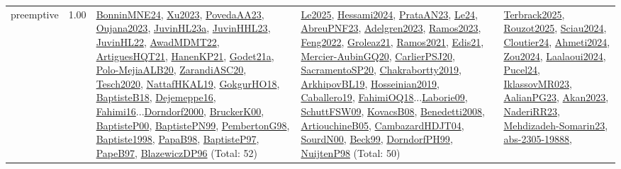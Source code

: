 {\begin{longtable}{p{3cm}r>{\raggedright\arraybackslash}p{6cm}>{\raggedright\arraybackslash}p{6cm}>{\raggedright\arraybackslash}p{8cm}}
\index{preemptive}\index{Concepts!preemptive}preemptive &  1.00 & \hyperref[detail:BonninMNE24]{BonninMNE24}, \hyperref[detail:Xu2023]{Xu2023}, \hyperref[detail:PovedaAA23]{PovedaAA23}, \hyperref[detail:Oujana2023]{Oujana2023}, \hyperref[detail:JuvinHL23a]{JuvinHL23a}, \hyperref[detail:JuvinHHL23]{JuvinHHL23}, \hyperref[detail:JuvinHL22]{JuvinHL22}, \hyperref[detail:AwadMDMT22]{AwadMDMT22}, \hyperref[detail:ArtiguesHQT21]{ArtiguesHQT21}, \hyperref[detail:HanenKP21]{HanenKP21}, \hyperref[detail:Godet21a]{Godet21a}, \hyperref[detail:Polo-MejiaALB20]{Polo-MejiaALB20}, \hyperref[detail:ZarandiASC20]{ZarandiASC20}, \hyperref[detail:Tesch2020]{Tesch2020}, \hyperref[detail:NattafHKAL19]{NattafHKAL19}, \hyperref[detail:GokgurHO18]{GokgurHO18}, \hyperref[detail:BaptisteB18]{BaptisteB18}, \hyperref[detail:Dejemeppe16]{Dejemeppe16}, \hyperref[detail:Fahimi16]{Fahimi16}...\hyperref[detail:Dorndorf2000]{Dorndorf2000}, \hyperref[detail:BruckerK00]{BruckerK00}, \hyperref[detail:BaptisteP00]{BaptisteP00}, \hyperref[detail:BaptistePN99]{BaptistePN99}, \hyperref[detail:PembertonG98]{PembertonG98}, \hyperref[detail:Baptiste1998]{Baptiste1998}, \hyperref[detail:PapaB98]{PapaB98}, \hyperref[detail:BaptisteP97]{BaptisteP97}, \hyperref[detail:PapeB97]{PapeB97}, \hyperref[detail:BlazewiczDP96]{BlazewiczDP96} (Total: 52) & \hyperref[detail:Le2025]{Le2025}, \hyperref[detail:Hessami2024]{Hessami2024}, \hyperref[detail:PrataAN23]{PrataAN23}, \hyperref[detail:Le24]{Le24}, \hyperref[detail:AbreuPNF23]{AbreuPNF23}, \hyperref[detail:Adelgren2023]{Adelgren2023}, \hyperref[detail:Ramos2023]{Ramos2023}, \hyperref[detail:Feng2022]{Feng2022}, \hyperref[detail:Groleaz21]{Groleaz21}, \hyperref[detail:Ramos2021]{Ramos2021}, \hyperref[detail:Edis21]{Edis21}, \hyperref[detail:Mercier-AubinGQ20]{Mercier-AubinGQ20}, \hyperref[detail:CarlierPSJ20]{CarlierPSJ20}, \hyperref[detail:SacramentoSP20]{SacramentoSP20}, \hyperref[detail:Chakrabortty2019]{Chakrabortty2019}, \hyperref[detail:ArkhipovBL19]{ArkhipovBL19}, \hyperref[detail:Hosseinian2019]{Hosseinian2019}, \hyperref[detail:Caballero19]{Caballero19}, \hyperref[detail:FahimiOQ18]{FahimiOQ18}...\hyperref[detail:Laborie09]{Laborie09}, \hyperref[detail:SchuttFSW09]{SchuttFSW09}, \hyperref[detail:KovacsB08]{KovacsB08}, \hyperref[detail:Benedetti2008]{Benedetti2008}, \hyperref[detail:ArtiouchineB05]{ArtiouchineB05}, \hyperref[detail:CambazardHDJT04]{CambazardHDJT04}, \hyperref[detail:SourdN00]{SourdN00}, \hyperref[detail:Beck99]{Beck99}, \hyperref[detail:DorndorfPH99]{DorndorfPH99}, \hyperref[detail:NuijtenP98]{NuijtenP98} (Total: 50) & \hyperref[detail:Terbrack2025]{Terbrack2025}, \hyperref[detail:Rouzot2025]{Rouzot2025}, \hyperref[detail:Sciau2024]{Sciau2024}, \hyperref[detail:Cloutier24]{Cloutier24}, \hyperref[detail:Ahmeti2024]{Ahmeti2024}, \hyperref[detail:Zou2024]{Zou2024}, \hyperref[detail:Laalaoui2024]{Laalaoui2024}, \hyperref[detail:Pucel24]{Pucel24}, \hyperref[detail:IklassovMR023]{IklassovMR023}, \hyperref[detail:AalianPG23]{AalianPG23}, \hyperref[detail:Akan2023]{Akan2023}, \hyperref[detail:NaderiRR23]{NaderiRR23}, \hyperref[detail:Mehdizadeh-Somarin23]{Mehdizadeh-Somarin23}, \hyperref[detail:abs-2305-19888]{abs-2305-19888}, 
\end{longtable}}
